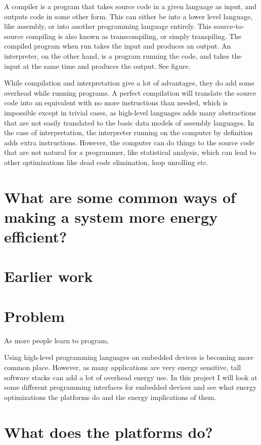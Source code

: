 A compiler is a program that takes source code in a given language as input, and outputs code in some other form. 
This can either be into a lower level language, like assembly, or into another programming language entirely.
This source-to-source compiling is also known as transcompiling, or simply transpiling.
The compiled program when run takes the input and produces an output. 
An interpreter, on the other hand, is a program running the code, and takes the input at the same time and produces the output. See figure.

While compilation and interpretation give a lot of advantages, they do add some overhead while running programs. 
A perfect compilation will translate the source code into an equivalent with no more instructions than needed, which is impossible except in trivial cases, as high-level languages adds many abstractions that are not easily translated to the basic data models of assembly languages. 
In the case of interpretation, the interpreter running on the computer by definition adds extra instructions. 
However, the computer can do things to the source code that are not natural for a programmer, like statistical analysis, which can lead to other optimizations like dead code elimination, loop unrolling etc.

\section{What are some common ways of making a system more energy efficient?}

\section{Earlier work}

\section{Problem}
As more people learn to program, 


Using high-level programming languages on embedded devices is becoming more common place. 
However, as many applications are very energy sensitive, tall software stacks can add a lot of overhead energy use. 
In this project I will look at some different programming interfaces for embedded devices and see what energy optimizations the platforms do and the energy implications of them.

\section{What does the platforms do?}
